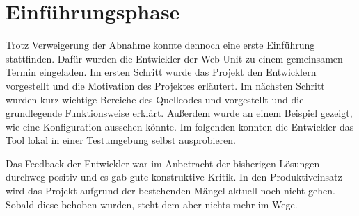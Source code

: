 \section{Einführungsphase}
\label{sec:Einfuehrungsphase}

Trotz Verweigerung der Abnahme konnte dennoch eine erste Einführung stattfinden. Dafür wurden die Entwickler der Web-Unit zu einem gemeinsamen Termin eingeladen. Im ersten Schritt wurde das Projekt den Entwicklern vorgestellt und die Motivation des Projektes erläutert. Im nächsten Schritt wurden kurz wichtige Bereiche des Quellcodes und vorgestellt und die grundlegende Funktionsweise erklärt. Außerdem wurde an einem Beispiel gezeigt, wie eine Konfiguration aussehen könnte. Im folgenden konnten die Entwickler das Tool lokal in einer Testumgebung selbst ausprobieren. 

Das Feedback der Entwickler war im Anbetracht der bisherigen Lösungen durchweg positiv und es gab gute konstruktive Kritik. In den Produktiveinsatz wird das Projekt aufgrund der bestehenden Mängel aktuell noch nicht gehen. Sobald diese behoben wurden, steht dem aber nichts mehr im Wege.